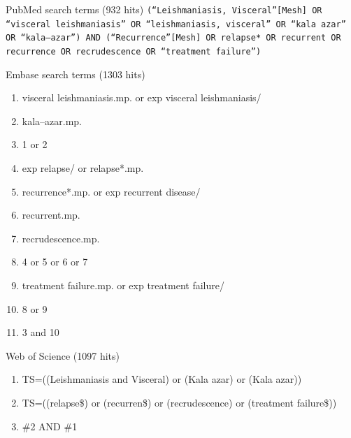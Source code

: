 \begin{mybox}[label=box:search1]{PubMed search terms (932 hits)}
  \texttt{(``Leishmaniasis, Visceral''[Mesh] OR ``visceral leishmaniasis'' OR ``leishmaniasis, visceral'' OR ``kala azar'' OR ``kala--azar'')
  AND
  (``Recurrence''[Mesh] OR relapse* OR recurrent OR recurrence OR recrudescence OR ``treatment failure'')}
\end{mybox}

\begin{mybox}[label=box:search2]{Embase search terms (1303 hits)}
  {\ttfamily
    \begin{enumerate}[noitemsep]
      \item visceral leishmaniasis.mp. or exp visceral leishmaniasis/
      \item kala--azar.mp.
      \item 1 or 2
      \item exp relapse/ or relapse*.mp.
      \item recurrence*.mp. or exp recurrent disease/
      \item recurrent.mp.
      \item recrudescence.mp.
      \item 4 or 5 or 6 or 7
      \item treatment failure.mp. or exp treatment failure/
      \item 8 or 9
      \item 3 and 10
    \end{enumerate}
  }
\end{mybox}

\begin{mybox}[label=box:search3]{Web of Science (1097 hits)}
  {\ttfamily
    \begin{enumerate}[noitemsep]
      \item TS=((Leishmaniasis and Visceral) or (Kala azar) or (Kala azar))
      \item TS=((relapse\$) or (recurren\$) or (recrudescence) or  (treatment failure\$))
      \item \#2 AND \#1
    \end{enumerate}
  }
\end{mybox}


